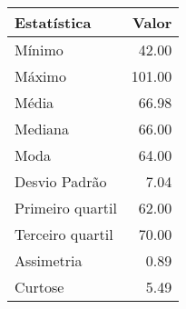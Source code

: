 \begin{table}[ht]
\centering
\begin{tabular}{lr}
  \hline
Estatística & Valor \\ 
  \hline
Mínimo & 42.00 \\ 
  Máximo & 101.00 \\ 
  Média & 66.98 \\ 
  Mediana & 66.00 \\ 
  Moda & 64.00 \\ 
  Desvio Padrão & 7.04 \\ 
  Primeiro quartil & 62.00 \\ 
  Terceiro quartil & 70.00 \\ 
  Assimetria & 0.89 \\ 
  Curtose & 5.49 \\ 
   \hline
\end{tabular}
\end{table}
